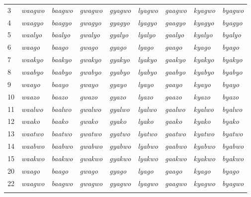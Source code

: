 \begin{table}
{\begin{tabular}{l l l l l l l l l}
3 & \textit{waagwo} & \textit{baagwo} & \textit{gwagwo} & \textit{gyagwo} & \textit{lyagwo} & \textit{gaagwo} & \textit{kyagwo} & \textit{byagwo}\\
4 & \textit{waagyo} & \textit{baagyo} & \textit{gwagyo} & \textit{gyagyo} & \textit{lyagyo} & \textit{gaagyo} & \textit{kyagyo} & \textit{byagyo}\\
5 & \textit{waalyo} & \textit{baalyo} & \textit{gwalyo} & \textit{gyalyo} & \textit{lyalyo} & \textit{gaalyo} & \textit{kyalyo} & \textit{byalyo}\\
6 & \textit{waago} & \textit{baago} & \textit{gwago} & \textit{gyago} & \textit{lyago} & \textit{gaago} & \textit{kyago} & \textit{byago}\\
7 & \textit{waakyo} & \textit{baakyo} & \textit{gwakyo} & \textit{gyakyo} & \textit{lyakyo} & \textit{gaakyo} & \textit{kyakyo} & \textit{byakyo}\\
8 & \textit{waabyo} & \textit{baabyo} & \textit{gwabyo} & \textit{gyabyo} & \textit{lyabyo} & \textit{gaabyo} & \textit{kyabyo} & \textit{byabyo}\\
9 & \textit{waayo} & \textit{baayo} & \textit{gwayo} & \textit{gyayo} & \textit{lyayo} & \textit{gaayo} & \textit{kyayo} & \textit{byayo}\\
10 & \textit{waazo} & \textit{baazo} & \textit{gwazo} & \textit{gyazo} & \textit{lyazo} & \textit{gaazo} & \textit{kyazo} & \textit{byazo}\\
11 & \textit{waalwo} & \textit{baalwo} & \textit{gwalwo} & \textit{gyalwo} & \textit{lyalwo} & \textit{gaalwo} & \textit{kyalwo} & \textit{byalwo}\\
12 & \textit{waako} & \textit{baako} & \textit{gwako} & \textit{gyako} & \textit{lyako} & \textit{gaako} & \textit{kyako} & \textit{byako}\\
13 & \textit{waatwo} & \textit{baatwo} & \textit{gwatwo} & \textit{gyatwo} & \textit{lyatwo} & \textit{gaatwo} & \textit{kyatwo} & \textit{byatwo}\\
14 & \textit{waabwo} & \textit{baabwo} & \textit{gwabwo} & \textit{gyabwo} & \textit{lyabwo} & \textit{gaabwo} & \textit{kyabwo} & \textit{byabwo}\\
15 & \textit{waakwo} & \textit{baakwo} & \textit{gwakwo} & \textit{gyakwo} & \textit{lyakwo} & \textit{gaakwo} & \textit{kyakwo} & \textit{byakwo}\\
20 & \textit{waago} & \textit{baago} & \textit{gwago} & \textit{gyago} & \textit{lyago} & \textit{gaago} & \textit{kyago} & \textit{byago}\\
22 & \textit{waagwo} & \textit{baagwo} & \textit{gwagwo} & \textit{gyagwo} & \textit{lyagwo} & \textit{gaagwo} & \textit{kyagwo} & \textit{byagwo}\\
\lspbottomrule
\end{tabular}
}
\label{tab-proposs3a}
\end{table}

